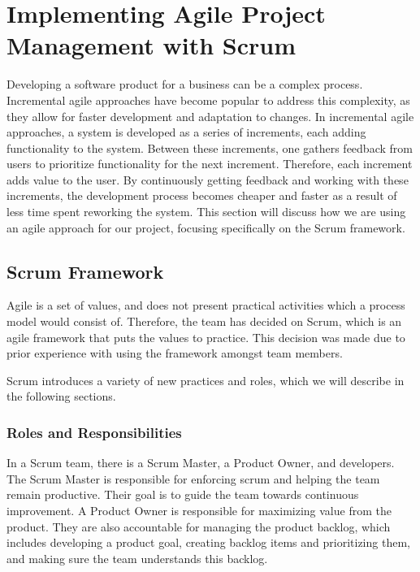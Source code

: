 \section{Implementing Agile Project Management with Scrum}
Developing a software product for a business can be a complex process.
Incremental agile approaches have become popular to address this complexity, as they allow for faster development and adaptation to changes.\cite{sommervilleSoftwareEngineering2016}
In incremental agile approaches, a system is developed as a series of increments, each adding functionality to the system.
Between these increments, one gathers feedback from users to prioritize functionality for the next increment.
Therefore, each increment adds value to the user.
By continuously getting feedback and working with these increments, the development process becomes cheaper and faster as a result of less time spent reworking the system.\cite{sommervilleSoftwareEngineering2016}
This section will discuss how we are using an agile approach for our project, focusing specifically on the Scrum framework.

\subsection*{Scrum Framework}
Agile is a set of values, and does not present practical activities which a process model would consist of\cite{sutherlandScrumArtDoing2014}.
Therefore, the team has decided on Scrum\cite{scrumdotorg}, which is an agile framework that puts the values to practice.
This decision was made due to prior experience with using the framework amongst team members.

Scrum introduces a variety of new practices and roles, which we will describe in the following sections.

\subsubsection*{Roles and Responsibilities}
In a Scrum team, there is a Scrum Master, a Product Owner, and developers.
The Scrum Master is responsible for enforcing scrum and helping the team remain productive.
Their goal is to guide the team towards continuous improvement.
A Product Owner is responsible for maximizing value from the product.
They are also accountable for managing the product backlog, which includes developing a product goal, creating backlog items and prioritizing them, and making sure the team understands this backlog.

